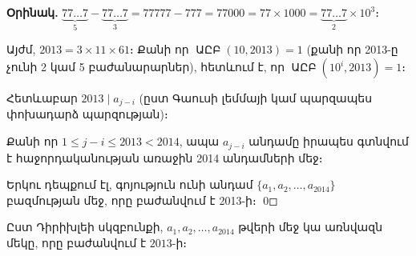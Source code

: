\documentclass[12pt, a4paper]{article}
\DeclareMathOperator{\armgcd}{ԱԸԲ}
\begin{document}
\textbf{Օրինակ.}\; $\underbrace{77\ldots7}_{5} - \underbrace{77\ldots7}_{3} = 77777 - 777 = 77000 = 77 \times 1000 = \underbrace{77\ldots7}_{2} \times 10^3$։

Այժմ, $2013 = 3 \times 11 \times 61$։ Քանի որ $\armgcd(10, 2013) = 1$
(քանի որ 2013-ը չունի 2 կամ 5 բաժանարարներ), հետևում է, որ $\armgcd(10^i, 2013) = 1$։

Հետևաբար $2013 \mid a_{j-i}$ (ըստ Գաուսի լեմմայի կամ պարզապես փոխադարձ պարզության)։

Քանի որ $1 \le j - i \le 2013 < 2014$, ապա $a_{j-i}$ անդամը իրապես գտնվում է
հաջորդականության առաջին 2014 անդամների մեջ։

\medskip
Երկու դեպքում էլ, գոյություն ունի անդամ $\{a_1, a_2, \ldots, a_{2014}\}$ բազմության մեջ,
որը բաժանվում է 2013-ի։ \qed

\begin{answerbox}
\centering
Ըստ Դիրիխլեի սկզբունքի, $a_1, a_2, \ldots, a_{2014}$ թվերի մեջ
կա առնվազն մեկը, որը բաժանվում է $2013$-ի։
\end{answerbox}
\end{document}
